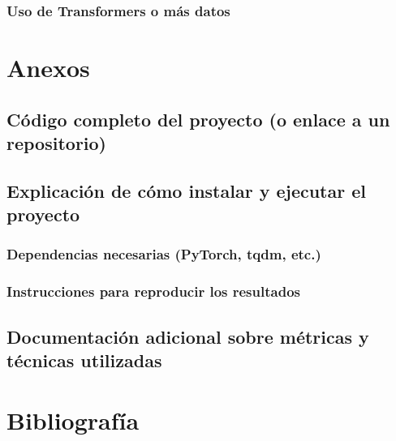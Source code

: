 \documentclass{article}
\begin{document}
\subsubsection{Uso de Transformers o más datos}

\section{Anexos}
\subsection{Código completo del proyecto (o enlace a un repositorio)}
\subsection{Explicación de cómo instalar y ejecutar el proyecto}
\subsubsection{Dependencias necesarias (PyTorch, tqdm, etc.)}
\subsubsection{Instrucciones para reproducir los resultados}
\subsection{Documentación adicional sobre métricas y técnicas utilizadas}

\newpage

\section{Bibliografía}
\nocite{*}
\printbibliography
\end{document}
